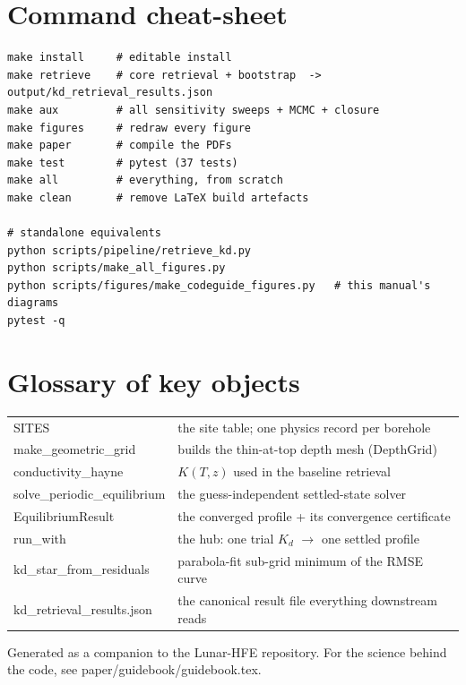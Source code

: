\documentclass[11pt]{report}
\newcommand{\code}[1]{{\ttfamily\small #1}}
\newcommand{\file}[1]{\textcolor{forest}{\ttfamily #1}}
\begin{document}
\appendix
\chapter{Command cheat-sheet}

\begin{lstlisting}[style=sh]
make install     # editable install
make retrieve    # core retrieval + bootstrap  -> output/kd_retrieval_results.json
make aux         # all sensitivity sweeps + MCMC + closure
make figures     # redraw every figure
make paper       # compile the PDFs
make test        # pytest (37 tests)
make all         # everything, from scratch
make clean       # remove LaTeX build artefacts

# standalone equivalents
python scripts/pipeline/retrieve_kd.py
python scripts/make_all_figures.py
python scripts/figures/make_codeguide_figures.py   # this manual's diagrams
pytest -q
\end{lstlisting}

\chapter{Glossary of key objects}

\begin{center}\small
\begin{tabular}{@{}lp{9.8cm}@{}}
\toprule
\code{SITES} & the site table; one physics record per borehole \\
\code{make\_geometric\_grid} & builds the thin-at-top depth mesh (\code{DepthGrid}) \\
\code{conductivity\_hayne} & $K(T,z)$ used in the baseline retrieval \\
\code{solve\_periodic\_equilibrium} & the guess-independent settled-state solver \\
\code{EquilibriumResult} & the converged profile + its convergence certificate \\
\code{run\_with} & the hub: one trial $K_d$ $\rightarrow$ one settled profile \\
\code{kd\_star\_from\_residuals} & parabola-fit sub-grid minimum of the RMSE curve \\
\code{kd\_retrieval\_results.json} & the canonical result file everything downstream reads \\
\bottomrule
\end{tabular}
\end{center}

\vfill
\noindent\textcolor{dim}{\small Generated as a companion to the Lunar-HFE
repository. For the science behind the code, see
\file{paper/guidebook/guidebook.tex}.}
\end{document}
